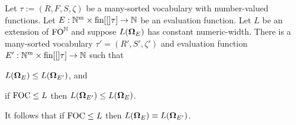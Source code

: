 \documentclass[../main/thesis.tex]{subfiles}
\begin{document}
\begin{prop}
  Let $\tau := (R, F, S, \zeta)$ be a many-sorted vocabulary with number-valued
  functions. Let $E : \mathbb{N}^m \times \text{\upshape fin}{[[]}\tau] \rightarrow \mathbb{N}$ be an evaluation
  function. Let $L$ be an extension of $\text{\upshape FO}^{\mathbb{N}}$ and suppose $L(\mathbf{\mathbf{\Omega}}_E)$
  has constant numeric-width. There is a many-sorted vocabulary $\tau' = (R',
  S', \zeta')$ and evaluation function $E' : \mathbb{N}^m \times \text{\upshape fin}{[[]}\tau] \rightarrow
  \mathbb{N}$ such that
  \begin{myenum}
  \item \label{obj:left-right} $L(\mathbf{\mathbf{\Omega}}_{E}) \leq L(\mathbf{\mathbf{\Omega}}_{E'})$, and
  \item \label{obj:FOC-right-left} if $\text{\upshape FOC} \leq L$ then $L(\mathbf{\mathbf{\Omega}}_{E'}) \leq
    L(\mathbf{\mathbf{\Omega}}_{E})$.
  \end{myenum}
  It follows that if $\text{\upshape FOC} \leq L$ then $L(\mathbf{\mathbf{\Omega}}_{E}) \equiv L(\mathbf{\mathbf{\Omega}}_{E'})$.
  \label{prop:op-to-op-on-formulas}
\end{prop}
\end{document}
